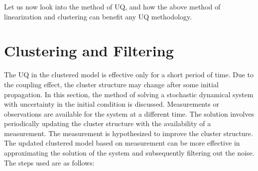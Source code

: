 Let us now look into the method of UQ, and how the above method of linearization and clustering can benefit any UQ methodology.




\section{Clustering and Filtering}
\label{method}
The UQ in the clustered model is effective only for a short period of time. Due to the coupling effect, the cluster structure may change after some initial propagation. In this section, the method of solving a stochastic dynamical system with uncertainty in the initial condition is discussed. Measurements or observations are available for the system at a different time. The solution involves periodically updating the cluster structure with the availability of a measurement. The measurement is hypothesized to improve the cluster structure. The updated clustered model based on measurement can be more effective in approximating the solution of the system and subsequently filtering out the noise. The steps used are as follows:

